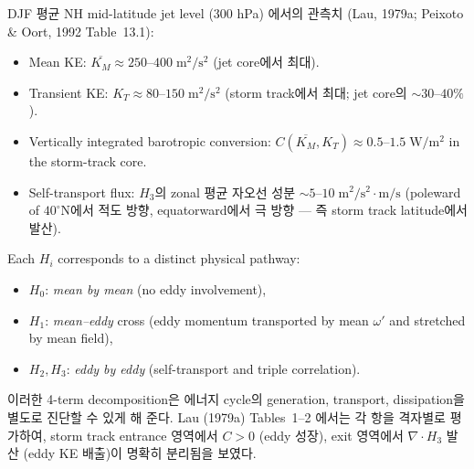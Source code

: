 \begin{example}\label{ex:ch06_te_magnitudes}
DJF 평균 NH mid-latitude jet level (300 hPa) 에서의 관측치 (Lau, 1979a;
Peixoto \& Oort, 1992 Table~13.1):
\begin{itemize}
  \item Mean KE: $\overline{K_M} \approx 250\text{--}400\;\text{m}^2/\text{s}^2$
        (jet core에서 최대).
  \item Transient KE: $K_T \approx 80\text{--}150\;\text{m}^2/\text{s}^2$
        (storm track에서 최대; jet core의 $\sim$$30$--$40\%$).
  \item Vertically integrated barotropic conversion:
        $C(\overline{K_M},K_T) \approx 0.5\text{--}1.5\;\text{W}/\text{m}^2$
        in the storm-track core.
  \item Self-transport flux: $H_3$의 zonal 평균 자오선 성분
        $\sim 5\text{--}10\;\text{m}^2/\text{s}^2 \cdot \text{m/s}$
        (poleward of $40^\circ\text{N}$에서 적도 방향, equatorward에서 극 방향
        --- 즉 storm track latitude에서 발산).
\end{itemize}
\end{example}


\begin{remark}\label{rem:ch06_te_four_H}
Each $H_i$ corresponds to a distinct physical pathway:
\begin{itemize}
  \item $H_0$: \emph{mean by mean} (no eddy involvement),
  \item $H_1$: \emph{mean--eddy} cross (eddy momentum transported by mean $\omega'$
        and stretched by mean field),
  \item $H_2, H_3$: \emph{eddy by eddy} (self-transport and triple correlation).
\end{itemize}
이러한 4-term decomposition은 에너지 cycle의 generation, transport,
dissipation을 별도로 진단할 수 있게 해 준다.  Lau (1979a) Tables~1--2
에서는 각 항을 격자별로 평가하여, storm track entrance 영역에서
$C > 0$ (eddy 성장), exit 영역에서 $\nabla\cdot H_3$ 발산 (eddy KE
배출)이 명확히 분리됨을 보였다.
\end{remark}


